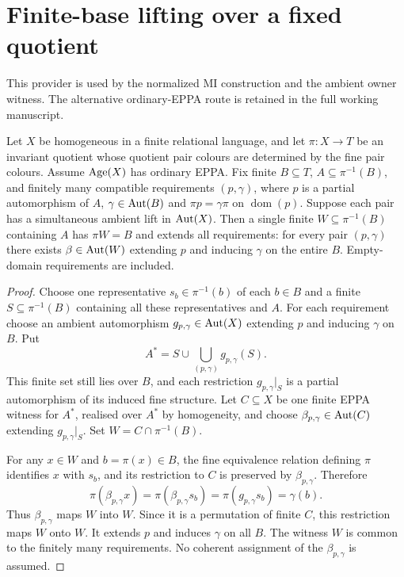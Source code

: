 \section{Finite-base lifting over a fixed quotient}
This provider is used by the normalized MI construction and the ambient
owner witness. The alternative ordinary-EPPA route is retained in the full working manuscript.

\begin{lemma}\label{lem:finite-base}
Let $X$ be homogeneous in a finite relational language, and let
$\pi:X\to T$ be an invariant quotient whose quotient pair colours
are determined by the fine pair colours. Assume $\operatorname{Age}(X)$ has
ordinary EPPA. Fix finite $B\subseteq T$, $A\subseteq\pi^{-1}(B)$,
and finitely many compatible requirements $(p,\gamma)$, where
$p$ is a partial automorphism of $A$, $\gamma\in\operatorname{Aut}(B)$ and
$\pi p=\gamma\pi$ on $\operatorname{dom}(p)$. Suppose each pair
has a simultaneous ambient lift in $\operatorname{Aut}(X)$.
Then a single finite $W\subseteq\pi^{-1}(B)$ containing $A$ has
$\pi W=B$ and extends all requirements: for every pair $(p,\gamma)$
there exists $\beta\in\operatorname{Aut}(W)$ extending $p$ and inducing $\gamma$
on the entire $B$. Empty-domain requirements are included.
\end{lemma}
\begin{proof}
Choose one representative $s_b\in\pi^{-1}(b)$ of each $b\in B$
and a finite $S\subseteq\pi^{-1}(B)$ containing all these
representatives and $A$. For each requirement choose an ambient
automorphism $g_{p,\gamma}\in\operatorname{Aut}(X)$ extending $p$ and inducing
$\gamma$ on $B$. Put
\[
 A^*=S\cup\bigcup_{(p,\gamma)}g_{p,\gamma}(S).
\]
This finite set still lies over $B$, and each restriction
$g_{p,\gamma}|_S$ is a partial automorphism of its induced fine
structure. Let $C\subseteq X$ be one finite EPPA witness for $A^*$,
realised over $A^*$ by homogeneity, and choose
$\beta_{p,\gamma}\in\operatorname{Aut}(C)$ extending $g_{p,\gamma}|_S$.
Set $W=C\cap\pi^{-1}(B)$.

For any $x\in W$ and $b=\pi(x)\in B$, the fine equivalence
relation defining $\pi$ identifies $x$ with $s_b$, and its
restriction to $C$ is preserved by $\beta_{p,\gamma}$. Therefore
\[
 \pi(\beta_{p,\gamma}x)
 =\pi(\beta_{p,\gamma}s_b)
 =\pi(g_{p,\gamma}s_b)=\gamma(b).
\]
Thus $\beta_{p,\gamma}$ maps $W$ into $W$. Since it is a
permutation of finite $C$, this restriction maps $W$ onto $W$.
It extends $p$ and induces $\gamma$ on all $B$.
The witness $W$ is common to the finitely many requirements.
No coherent assignment of the $\beta_{p,\gamma}$ is assumed.
\end{proof}

